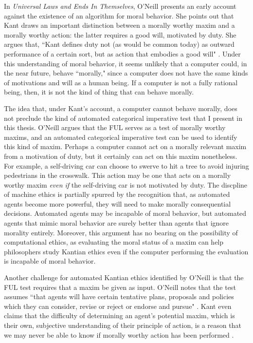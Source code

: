 \begin{isabellebody}
\begin{isamarkuptext}
In \emph{Universal Laws and Ends In Themselves}, O'Neill presents an early account against the existence of an algorithm for
moral behavior. She points out that Kant draws an important distinction between a morally worthy maxim
and a morally worthy action: the latter requires a good will, motivated by duty. She argues that, 
``Kant defines duty not (as would be common today) as outward performance of a certain sort, but as action
that embodies a good will" \citep[345]{oneilluniversallaws}. Under this understanding of moral behavior, 
it seems unlikely that a computer could, in the near future, behave ``morally," since a computer does 
not have the same kinds of motivations and will as a human being. If a computer is not a fully rational
being, then, it is not the kind of thing that can behave morally.

The idea that, under Kant's account, a computer cannot behave morally, does not preclude the kind 
of automated categorical imperative test that I present in this thesis. O'Neill argues that the FUL
serves as a test of morally worthy maxims, and an automated categorical imperative test can be used 
to identify this kind of maxim. Perhaps a computer cannot act on a morally relevant maxim from a motivation of duty, 
but it certainly can act on this maxim nonetheless. For example, a self-driving car can choose to swerve to hit a tree
to avoid injuring pedestrians in the crosswalk. This action may be one that acts on a morally worthy maxim
\emph{even if} the self-driving car is not motivated by duty. The discpline of machine ethics is partially
spurred by the recognition that, as automated agents become more powerful, they will need to make
morally consequential decisions. Automated agents may be incapable of moral behavior, but automated agents that mimic
moral behavior are surely better than agents that ignore morality entirely. Moreover, this argument
has no bearing on the possibility of computational ethics, as evaluating the moral status of a maxim can 
help philosophers study Kantian ethics even if the computer performing the evaluation is incapable of 
moral behavior.

Another challenge for automated Kantian ethics identified by O'Neill is that the FUL test requires that
a maxim be given as input. O'Neill notes that the test assumes ``that agents will have certain tentative 
plans, proposals and policies which they can consider, revise or reject or endorse and pursue" \citep[343]{oneilluniversallaws}.
Kant even claims that the difficulty of determining an agent's potential maxim, which is their
own, subjective understanding of their principle of action, is a reason that we may never be able 
to know if morally worthy action has been performed \cite[345]{oneilluniversallaws}. 


\end{isamarkuptext}
\end{isabellebody}
